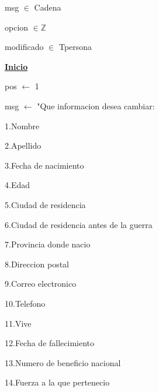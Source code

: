 \documentclass{article}
\begin{document}
            \hspace{12mm}msg $\in$ Cadena

            \hspace{12mm}opcion $\in \mathbb{Z}$

            \hspace{12mm}modificado $\in$ Tpersona

        \hspace{8mm}\underline{\textbf{Inicio}}

            \hspace{12mm}pos $\leftarrow$ 1

            \hspace{12mm}msg $\leftarrow$ "Que informacion desea cambiar: 

                \hspace{25mm}1.Nombre

                \hspace{25mm}2.Apellido

                \hspace{25mm}3.Fecha de nacimiento

                \hspace{25mm}4.Edad

                \hspace{25mm}5.Ciudad de residencia
                
                \hspace{25mm}6.Ciudad de residencia antes de la guerra

                \hspace{25mm}7.Provincia donde nacio

                \hspace{25mm}8.Direccion postal

                \hspace{25mm}9.Correo electronico

                \hspace{25mm}10.Telefono

                \hspace{25mm}11.Vive

                \hspace{25mm}12.Fecha de fallecimiento

                \hspace{25mm}13.Numero de beneficio nacional

                \hspace{25mm}14.Fuerza a la que pertenecio
\end{document}
